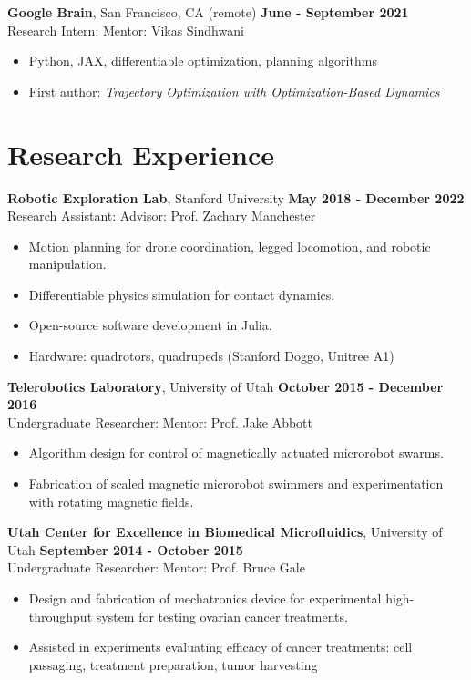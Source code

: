 \documentclass[10pt]{article}
\begin{document}
\noindent\textbf{Google Brain}, San Francisco, CA (remote) \hfill \textbf{June - September 2021} \\
Research Intern: \hfill Mentor: {\color{lightgray} Vikas Sindhwani}
\begin{itemize}
    \item {\color{lightgray} Python, JAX, differentiable optimization, planning algorithms}
    \item {\color{lightgray} First author: 
    \textit{Trajectory Optimization with Optimization-Based Dynamics}}
\end{itemize}

\section*{Research Experience}
\textbf{Robotic Exploration Lab}, Stanford University \hfill \textbf{May 2018 - December 2022} \\
Research Assistant: \hfill Advisor: {\color{lightgray} Prof. Zachary Manchester}
\begin{itemize}
    \item {\color{lightgray} Motion planning for drone coordination, legged locomotion, and robotic manipulation.}
    \item {\color{lightgray} Differentiable physics simulation for contact dynamics.}
    \item {\color{lightgray} Open-source software development in Julia.}
    \item{\color{lightgray} Hardware: quadrotors, quadrupeds (Stanford Doggo, Unitree A1)}
\end{itemize}

\noindent\textbf{Telerobotics Laboratory}, University of Utah \hfill \textbf{October 2015 - December 2016} \\
Undergraduate Researcher: \hfill Mentor: {\color{lightgray} Prof. Jake Abbott}
\begin{itemize}
    \item {\color{lightgray} Algorithm design for control of magnetically actuated microrobot swarms.}
    \item {\color{lightgray} Fabrication of scaled magnetic microrobot swimmers and experimentation with rotating magnetic fields.}
\end{itemize}

\noindent\textbf{Utah Center for Excellence in Biomedical Microfluidics}, University of Utah \hfill \textbf{September 2014 - October 2015} \\
Undergraduate Researcher: \hfill Mentor: {\color{lightgray} Prof. Bruce Gale}
\begin{itemize}
    \item {\color{lightgray} Design and fabrication of mechatronics device for experimental high-throughput system for testing ovarian cancer treatments.}
    \item {\color{lightgray} Assisted in experiments evaluating efficacy of cancer treatments: cell passaging, treatment preparation, tumor harvesting}
\end{itemize}
\end{document}
